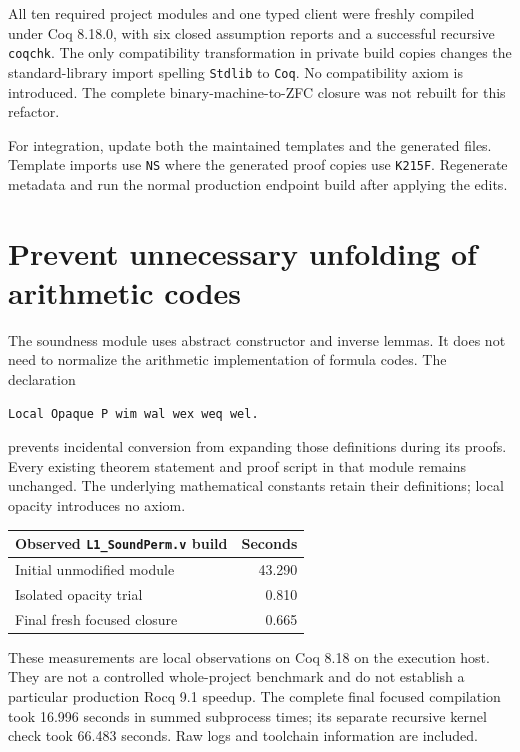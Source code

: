 \documentclass[11pt]{article}
\newcommand{\code}[1]{\texttt{#1}}
\begin{document}
All ten required project modules and one typed client were freshly compiled under Coq 8.18.0, with six closed assumption reports and a successful recursive \code{coqchk}. The only compatibility transformation in private build copies changes the standard-library import spelling \code{Stdlib} to \code{Coq}. No compatibility axiom is introduced. The complete binary-machine-to-ZFC closure was not rebuilt for this refactor.

For integration, update both the maintained  templates and the generated  files. Template imports use \code{NS} where the generated proof copies use \code{K215F}. Regenerate metadata and run the normal production endpoint build after applying the edits.



\section{Prevent unnecessary unfolding of arithmetic codes}

The soundness module uses abstract constructor and inverse lemmas. It does not need to normalize the arithmetic implementation of formula codes. The declaration
\begin{lstlisting}
Local Opaque P wim wal wex weq wel.
\end{lstlisting}
prevents incidental conversion from expanding those definitions during its proofs. Every existing theorem statement and proof script in that module remains unchanged. The underlying mathematical constants retain their definitions; local opacity introduces no axiom.

\begin{center}
\begin{tabular}{@{}lr@{}}
\toprule
Observed \code{L1\_SoundPerm.v} build & Seconds\\
\midrule
Initial unmodified module & 43.290\\
Isolated opacity trial & 0.810\\
Final fresh focused closure & 0.665\\
\bottomrule
\end{tabular}
\end{center}

These measurements are local observations on Coq 8.18 on the execution host. They are not a controlled whole-project benchmark and do not establish a particular production Rocq 9.1 speedup. The complete final focused compilation took 16.996 seconds in summed subprocess times; its separate recursive kernel check took 66.483 seconds. Raw logs and toolchain information are included.
\end{document}
